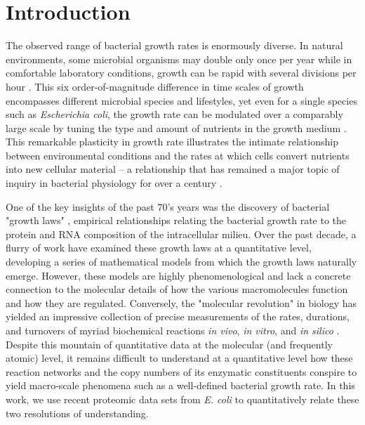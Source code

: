 \section{Introduction}
The observed range of bacterial growth rates is enormously diverse. In
natural environments, some microbial organisms may double only once per
year \citep{mikucki2009} while in comfortable laboratory conditions, growth
can be rapid with several divisions per hour \citep{schaechter1958}. This six
order-of-magnitude difference in time scales of growth encompasses different microbial
species and lifestyles, yet even for a single species such as \textit{Escherichia
coli}, the growth rate can be modulated over a comparably large scale by tuning the
type and amount of nutrients in the growth medium \citep{liu2005a}. This remarkable
plasticity in growth rate illustrates the intimate relationship between
environmental conditions and the rates at which cells convert nutrients into
new cellular material -- a relationship that has remained a major topic of
inquiry in bacterial physiology for over a century \citep{jun2018}.


One of the key insights of the past 70's years was the discovery of bacterial
"growth laws" \citep{schaechter1958}, empirical relationships relating the
bacterial growth rate to the protein and RNA composition of the intracellular
milieu. Over the past decade, a flurry of work \citep{molenaar2009,
scott2010, klumpp2014, basan2015, dai2016, erickson2017} have examined these
growth laws at a quantitative level, developing a series of mathematical
models from which the growth laws naturally emerge. However, these models are
highly phenomenological and lack a concrete connection to the molecular
details of how the various macromolecules function and how they are
regulated. Conversely, the "molecular revolution" in biology has yielded an
impressive collection of precise measurements of the rates, durations, and
turnovers of myriad biochemical reactions \textit{in vivo}, \textit{in
vitro}, and \textit{in silico} \citep{davidi2016a}. Despite this mountain of
quantitative data at the molecular (and frequently atomic) level, it remains
difficult to understand at a quantitative level how these reaction networks
and the copy numbers of its enzymatic constituents conspire to yield
macro-scale phenomena such as a well-defined bacterial growth rate. In this
work, we use recent proteomic data sets from \textit{E. coli} to
quantitatively relate these two resolutions of understanding.


